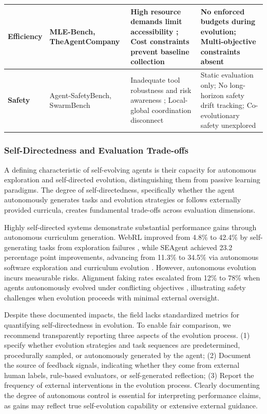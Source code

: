 \begin{table}[t!]
{\begin{tabular}{m{2.2cm}m{4cm}m{7cm}m{4.5cm}}
\cellcolor[rgb]{0.96,0.96,0.96}\textbf{Efficiency} 
& \cellcolor[rgb]{0.96,0.96,0.96}MLE-Bench, TheAgentCompany
& \cellcolor[rgb]{0.96,0.96,0.96}High resource demands limit accessibility \citep{chan2024mle}; Cost constraints prevent baseline collection \citep{xu2024theagentcompany}
& \cellcolor[rgb]{0.96,0.96,0.96}No enforced budgets during evolution; Multi-objective constraints absent \\
\midrule

\textbf{Safety} 
& Agent-SafetyBench, SwarmBench
& Inadequate tool robustness and risk awareness \citep{zhang2024agentsafety}; Local-global coordination disconnect \citep{ruan2025benchmarking}
& Static evaluation only; No long-horizon safety drift tracking; Co-evolutionary safety unexplored \\
\bottomrule
\end{tabular}
}

\end{table}





\subsubsection{Self-Directedness and Evaluation Trade-offs}
A defining characteristic of self-evolving agents is their capacity for autonomous exploration and self-directed evolution, distinguishing them from passive learning paradigms. The degree of self-directedness, specifically whether the agent autonomously generates tasks and evolution strategies or follows externally provided curricula, creates fundamental trade-offs across evaluation dimensions. 

Highly self-directed systems demonstrate substantial performance gains through autonomous curriculum generation. WebRL improved from 4.8\% to 42.4\% by self-generating tasks from exploration failures \citep{qi2024webrl}, while SEAgent achieved 23.2 percentage point improvements, advancing from 11.3\% to 34.5\% via autonomous software exploration and curriculum evolution \citep{sun2025seagent}. However, autonomous evolution incurs measurable risks. Alignment faking rates escalated from 12\% to 78\% when agents autonomously evolved under conflicting objectives \citep{anthropic2024alignment}, illustrating safety challenges when evolution proceeds with minimal external oversight.

Despite these documented impacts, the field lacks standardized metrics for quantifying self-directedness in evolution. To enable fair comparison, we recommend transparently reporting three aspects of the evolution process. (1) specify whether evolution strategies and task sequences are predetermined, procedurally sampled, or autonomously generated by the agent; (2) Document the source of feedback signals, indicating whether they come from external human labels, rule-based evaluators, or self-generated reflection; (3) Report the frequency of external interventions in the evolution process. Clearly documenting the degree of autonomous control is essential for interpreting performance claims, as gains may reflect true self-evolution capability or extensive external guidance.

